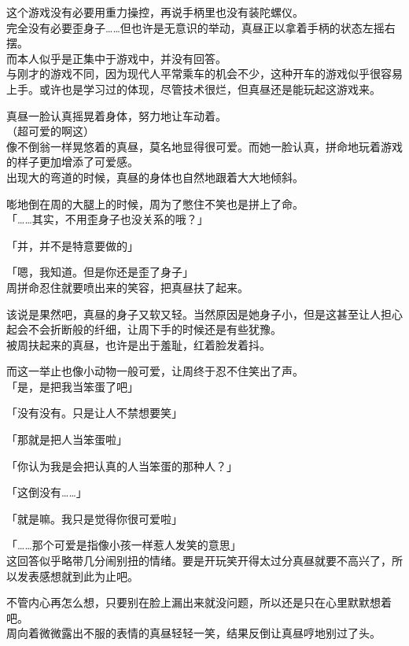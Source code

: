 这个游戏没有必要用重力操控，再说手柄里也没有装陀螺仪。\\

完全没有必要歪身子……但也许是无意识的举动，真昼正以拿着手柄的状态左摇右摆。\\

而本人似乎是正集中于游戏中，并没有回答。\\

与刚才的游戏不同，因为现代人平常乘车的机会不少，这种开车的游戏似乎很容易上手。或许也是学习过的体现，尽管技术很烂，但真昼还是能玩起这游戏来。

真昼一脸认真摇晃着身体，努力地让车动着。\\

（超可爱的啊这）\\

像不倒翁一样晃悠着的真昼，莫名地显得很可爱。而她一脸认真，拼命地玩着游戏的样子更加增添了可爱感。\\

出现大的弯道的时候，真昼的身体也自然地跟着大大地倾斜。

嘭地倒在周的大腿上的时候，周为了憋住不笑也是拼上了命。\\

「……其实，不用歪身子也没关系的哦？」

「并，并不是特意要做的」

「嗯，我知道。但是你还是歪了身子」\\

周拼命忍住就要喷出来的笑容，把真昼扶了起来。

该说是果然吧，真昼的身子又软又轻。当然原因是她身子小，但是这甚至让人担心起会不会折断般的纤细，让周下手的时候还是有些犹豫。\\

被周扶起来的真昼，也许是出于羞耻，红着脸发着抖。

而这一举止也像小动物一般可爱，让周终于忍不住笑出了声。\\

「是，是把我当笨蛋了吧」

「没有没有。只是让人不禁想要笑」

「那就是把人当笨蛋啦」

「你认为我是会把认真的人当笨蛋的那种人？」

「这倒没有……」

「就是嘛。我只是觉得你很可爱啦」

「……那个可爱是指像小孩一样惹人发笑的意思」\\

这回答似乎略带几分闹别扭的情绪。要是开玩笑开得太过分真昼就要不高兴了，所以发表感想就到此为止吧。

不管内心再怎么想，只要别在脸上漏出来就没问题，所以还是只在心里默默想着吧。\\

周向着微微露出不服的表情的真昼轻轻一笑，结果反倒让真昼哼地别过了头。
